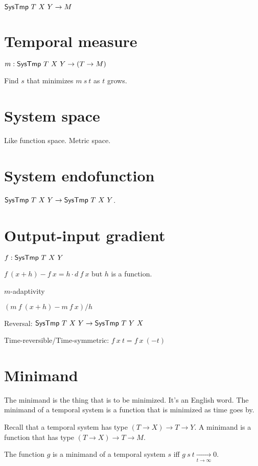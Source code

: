 \( \textsf{SysTmp}~T~X~Y \to M \)

\section{Temporal measure}

\( m : \textsf{SysTmp}~T~X~Y \to (T \to M) \)

Find \(s\) that minimizes \(m~s~t\) as \(t\) grows.

\section{System space}

Like function space.
Metric space.

\section{System endofunction}

\( \textsf{SysTmp}~T~X~Y \to \textsf{SysTmp}~T~X~Y \).

\section{Output-input gradient}

\( f : \textsf{SysTmp}~T~X~Y \)

\( f~(x+h) - f~x = h \cdot d~f~x \) but \(h\) is a function.

\(m\)-adaptivity

\( (m~f~(x+h) - m~f~x) / h \)

Reversal:
\( \textsf{SysTmp}~T~X~Y \to \textsf{SysTmp}~T~Y~X \)

Time-reversible/Time-symmetric:
\( f~x~t = f~x~(-t) \)

\section{Minimand}

The minimand is the thing that is to be minimized.
It's an English word.
The minimand of a temporal system is a function that is minimized as time goes by.

Recall that a temporal system has type \((T \to X) \to T \to Y\).
A minimand is a function that has type \((T \to X) \to T \to M\).

\begin{m:def}
    The function \(g\) is a minimand of a temporal system \(s\) iff \(g~s~t \xrightarrow[t \to \infty]{} 0\).
\end{m:def}

